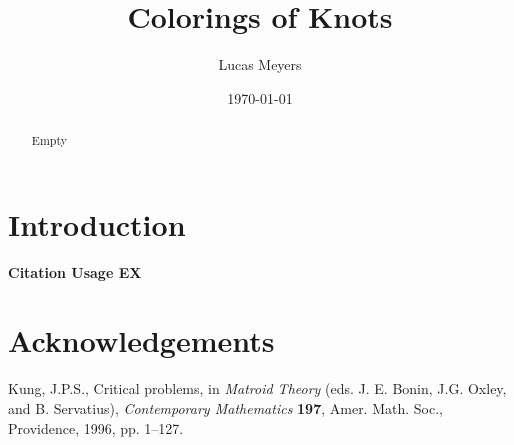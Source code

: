 \documentclass[12pt]{amsart}
\theoremstyle{definition}
\theoremstyle{remark}
\numberwithin{equation}{section}
\begin{document}
\title{Colorings of Knots}


\author{Lucas Meyers}
\address{Mathematics Department\\
Louisiana State University\\
Baton Rouge, Louisiana}

\date{\today}

\begin{abstract}
  Empty
\end{abstract}



\maketitle

\section{Introduction}
\label{introduction}

\textbf{Citation Usage EX}~\cite[Problem 2.4.6]{jpsk}

\section*{Acknowledgements}
\begin{thebibliography}{99}

 Kung, J.P.S., Critical problems, in {\em Matroid  
Theory} (eds. J. E. Bonin, J.G. Oxley, and B. Servatius), {\em  
Contemporary Mathematics} {\bf 197}, Amer. Math. Soc., Providence,  
1996, pp. 1--127.

\end{thebibliography}
\end{document}
